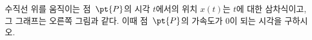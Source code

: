 \noindent\begin{minipage}[t]{0.58\linewidth}\vspace{0pt}\raggedright 수직선 위를 움직이는 점~$\pt{P}$의 시각 $t$에서의 위치 $x(t)$는 $t$에 대한 삼차식이고, 그 그래프는 오른쪽 그림과 같다. 이때 점~$\pt{P}$의 가속도가 $0$이 되는 시각을 구하시오.\end{minipage}\hfill\begin{minipage}[t]{0.4\linewidth}\vspace{0pt}\centering \resizebox{\ifdim\width>\linewidth\linewidth\else\width\fi}{!}{}\end{minipage}\par
